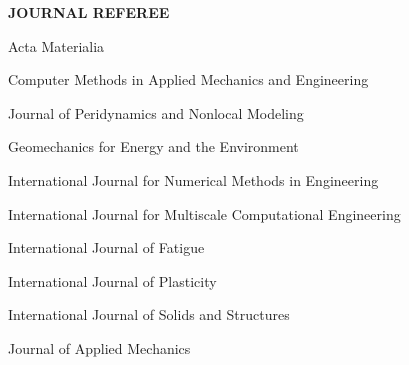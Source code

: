 
\vspace{\sectionskip}
\noindent
{\large \textbf{JOURNAL REFEREE}}
\vspace{\sectionskip}

\begin{minipage}{\minipagewidth}
Acta Materialia
\end{minipage}\vspace{\parskip}

\begin{minipage}{\minipagewidth}
Computer Methods in Applied Mechanics and Engineering
\end{minipage}\vspace{\parskip}

\begin{minipage}{\minipagewidth}
Journal of Peridynamics and Nonlocal Modeling
\end{minipage}\vspace{\parskip}

\begin{minipage}{\minipagewidth}
Geomechanics for Energy and the Environment
\end{minipage}\vspace{\parskip}

\begin{minipage}{\minipagewidth}
International Journal for Numerical Methods in Engineering
\end{minipage}\vspace{\parskip}

\begin{minipage}{\minipagewidth}
International Journal for Multiscale Computational Engineering
\end{minipage}\vspace{\parskip}

\begin{minipage}{\minipagewidth}
International Journal of Fatigue
\end{minipage}\vspace{\parskip}

\begin{minipage}{\minipagewidth}
International Journal of Plasticity
\end{minipage}\vspace{\parskip}

\begin{minipage}{\minipagewidth}
International Journal of Solids and Structures
\end{minipage}\vspace{\parskip}

\begin{minipage}{\minipagewidth}
Journal of Applied Mechanics
\end{minipage}\vspace{\parskip}
